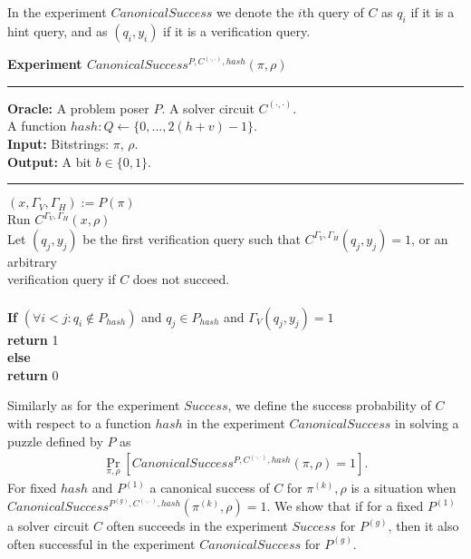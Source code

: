 In the experiment $CanonicalSuccess$ we denote the $i$th query of $C$ as $q_i$ if it is a hint query, and as $(q_i, y_i)$ if it is a verification query.
%
\begin{codeblock}
  \textbf{Experiment $CanonicalSuccess^{P, C^{(\cdot, \cdot)}, hash}(\pi, \rho)$}
  \medskip

  \hrule

  \medskip
  \textbf{Oracle:} A problem poser $P$. A solver circuit $C^{(\cdot, \cdot)}$.\\
  \IndII A function $hash: Q \leftarrow \{0, \dots, 2(h+v) - 1\}$.\\
  \textbf{Input:}  Bitstrings: $\pi$, $\rho$. \\
  \textbf{Output:} A bit $b \in \{0,1\}$.

  \medskip\hrule\medskip
  $(x, \Gamma_V, \Gamma_H) := P(\pi)$\\
  Run $C^{\Gamma_V, \Gamma_H} (x, \rho)$ \\
  \IndI Let $(q_j,y_j)$ be the first verification query such that $C^{\Gamma_V, \Gamma_H}(q_j, y_j) = 1$, or an arbitrary\\ \IndI
  verification query if $C$ does not succeed.\\
  \\
  \textbf{If} $(\forall i < j :  q_i \notin P_{hash} )$ and $q_j \in P_{hash}$ and $\Gamma_V(q_j, y_j) = 1$ \\
  \IndI \textbf{return} 1\\
  \textbf{else}\\
  \IndI \textbf{return} 0
\end{codeblock}
%
Similarly as for the experiment $Success$, we define the success probability of $C$ with respect to a function $hash$
in the experiment $CanonicalSuccess$ in solving a puzzle defined by $P$ as
%
\begin{align}
 \underset{\pi, \rho}{\Pr}[CanonicalSuccess^{P,C^{(\cdot, \cdot)},hash}(\pi, \rho) = 1].
\end{align}
%
For fixed $hash$ and $P^{(1)}$ a canonical success of $C$ for $\pi^{(k )}, \rho$ is a situation when \\ $CanonicalSuccess^{P^{(g)}, C^{(\cdot, \cdot)}, hash}(\pi^{(k)}, \rho) = 1$.
We show that if for a fixed $P^{(1)}$ a solver circuit $C$ often succeeds in the experiment $Success$ for $P^{(g)}$,
then it also often successful in the experiment $CanonicalSuccess$ for $P^{(g)}$.

